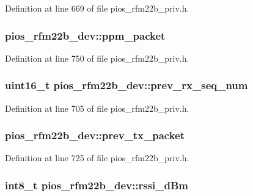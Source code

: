 \-Definition at line 669 of file pios\-\_\-rfm22b\-\_\-priv.\-h.

\hypertarget{structpios__rfm22b__dev_abdfbc812f36087f9b8392e9303f28086}{
\subsubsection[{ppm\-\_\-packet}]{ {\bf pios\-\_\-rfm22b\-\_\-dev\-::ppm\-\_\-packet}}}\label{structpios__rfm22b__dev_abdfbc812f36087f9b8392e9303f28086}


\-Definition at line 750 of file pios\-\_\-rfm22b\-\_\-priv.\-h.

\hypertarget{structpios__rfm22b__dev_a932f3bf8b3d7c94a5404fad6ff6801d4}{
\subsubsection[{prev\-\_\-rx\-\_\-seq\-\_\-num}]{\setlength{\rightskip}{0pt plus 5cm}uint16\-\_\-t {\bf pios\-\_\-rfm22b\-\_\-dev\-::prev\-\_\-rx\-\_\-seq\-\_\-num}}}\label{structpios__rfm22b__dev_a932f3bf8b3d7c94a5404fad6ff6801d4}


\-Definition at line 705 of file pios\-\_\-rfm22b\-\_\-priv.\-h.

\hypertarget{structpios__rfm22b__dev_a4c0368362858e8e4450ce094670e9b3d}{
\subsubsection[{prev\-\_\-tx\-\_\-packet}]{ {\bf pios\-\_\-rfm22b\-\_\-dev\-::prev\-\_\-tx\-\_\-packet}}}\label{structpios__rfm22b__dev_a4c0368362858e8e4450ce094670e9b3d}


\-Definition at line 725 of file pios\-\_\-rfm22b\-\_\-priv.\-h.

\hypertarget{structpios__rfm22b__dev_a7efa2c785a1c9feaff4db472c1f22805}{
\subsubsection[{rssi\-\_\-d\-Bm}]{\setlength{\rightskip}{0pt plus 5cm}int8\-\_\-t {\bf pios\-\_\-rfm22b\-\_\-dev\-::rssi\-\_\-d\-Bm}}}\label{structpios__rfm22b__dev_a7efa2c785a1c9feaff4db472c1f22805}


